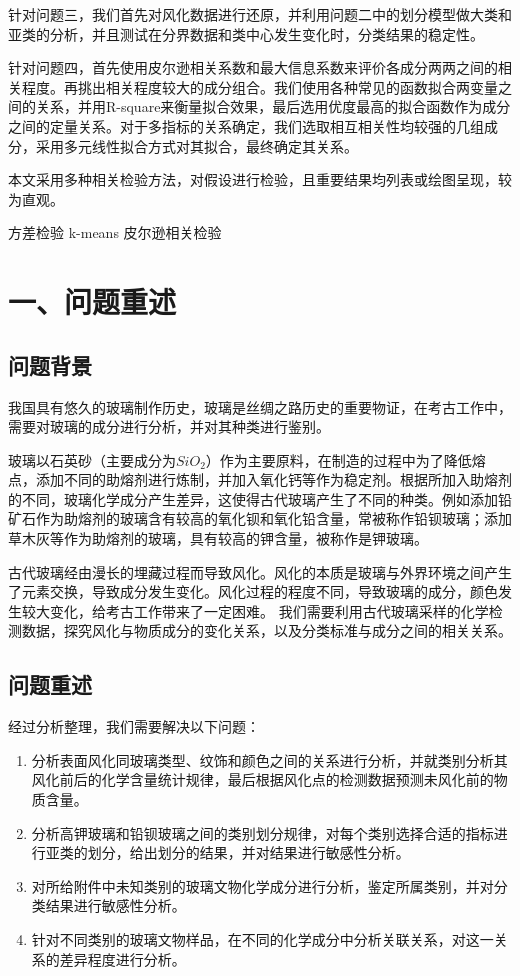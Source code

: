 \documentclass{my_paper}
\begin{document}
针对问题三，我们首先对风化数据进行还原，并利用问题二中的划分模型做大类和亚类的分析，并且测试在分界数据和类中心发生变化时，分类结果的稳定性。

针对问题四，首先使用皮尔逊相关系数和最大信息系数来评价各成分两两之间的相关程度。再挑出相关程度较大的成分组合。我们使用各种常见的函数拟合两变量之间的关系，并用R-square来衡量拟合效果，最后选用优度最高的拟合函数作为成分之间的定量关系。对于多指标的关系确定，我们选取相互相关性均较强的几组成分，采用多元线性拟合方式对其拟合，最终确定其关系。

本文采用多种相关检验方法，对假设进行检验，且重要结果均列表或绘图呈现，较为直观。

\begin{guanjianci}
 方差检验 \quad k-means \quad 皮尔逊相关检验
\end{guanjianci}

\newpage
\section{一、问题重述}

\subsection{问题背景}

我国具有悠久的玻璃制作历史，玻璃是丝绸之路历史的重要物证，在考古工作中，需要对玻璃的成分进行分析，并对其种类进行鉴别。

玻璃以石英砂（主要成分为$SiO_2$）作为主要原料，在制造的过程中为了降低熔点，添加不同的助熔剂进行炼制，并加入氧化钙等作为稳定剂。根据所加入助熔剂的不同，玻璃化学成分产生差异，这使得古代玻璃产生了不同的种类。例如添加铅矿石作为助熔剂的玻璃含有较高的氧化钡和氧化铅含量，常被称作铅钡玻璃；添加草木灰等作为助熔剂的玻璃，具有较高的钾含量，被称作是钾玻璃。

古代玻璃经由漫长的埋藏过程而导致风化。风化的本质是玻璃与外界环境之间产生了元素交换，导致成分发生变化。风化过程的程度不同，导致玻璃的成分，颜色发生较大变化，给考古工作带来了一定困难。
我们需要利用古代玻璃采样的化学检测数据，探究风化与物质成分的变化关系，以及分类标准与成分之间的相关关系。

\subsection{问题重述}
经过分析整理，我们需要解决以下问题：
\begin{enumerate}
    \item 分析表面风化同玻璃类型、纹饰和颜色之间的关系进行分析，并就类别分析其风化前后的化学含量统计规律，最后根据风化点的检测数据预测未风化前的物质含量。
    \item 分析高钾玻璃和铅钡玻璃之间的类别划分规律，对每个类别选择合适的指标进行亚类的划分，给出划分的结果，并对结果进行敏感性分析。
    \item 对所给附件中未知类别的玻璃文物化学成分进行分析，鉴定所属类别，并对分类结果进行敏感性分析。
    \item 针对不同类别的玻璃文物样品，在不同的化学成分中分析关联关系，对这一关系的差异程度进行分析。
\end{enumerate}
\end{document}
